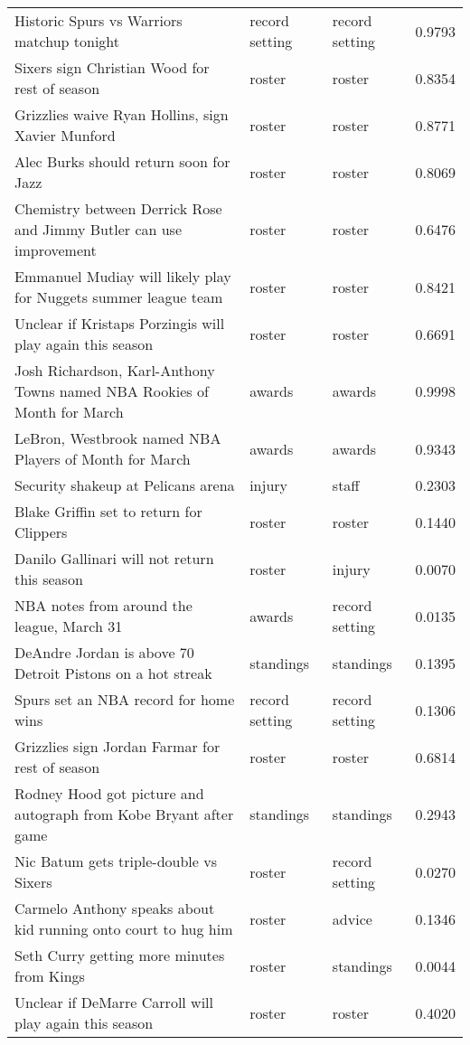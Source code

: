 \begin{table}[!htbp]
\begin{center}
\begin{tabular}{ l l l l}
Historic Spurs vs Warriors matchup tonight & record setting & record setting & 0.9793\\
Sixers sign Christian Wood for rest of season & roster & roster & 0.8354\\
Grizzlies waive Ryan Hollins, sign Xavier Munford & roster & roster & 0.8771\\
Alec Burks should return soon for Jazz & roster & roster & 0.8069\\
Chemistry between Derrick Rose and Jimmy Butler can use improvement & roster & roster & 0.6476\\
Emmanuel Mudiay will likely play for Nuggets summer league team & roster & roster & 0.8421\\
Unclear if Kristaps Porzingis will play again this season & roster & roster & 0.6691\\
Josh Richardson, Karl-Anthony Towns named NBA Rookies of Month for March & awards & awards & 0.9998\\
LeBron, Westbrook named NBA Players of Month for March & awards & awards & 0.9343\\
Security shakeup at Pelicans arena & injury & staff & 0.2303\\
Blake Griffin set to return for Clippers & roster & roster & 0.1440\\
Danilo Gallinari will not return this season & roster & injury & 0.0070\\
NBA notes from around the league, March 31 & awards & record setting & 0.0135\\
DeAndre Jordan is above 70%
Detroit Pistons on a hot streak & standings & standings & 0.1395\\
Spurs set an NBA record for home wins & record setting & record setting & 0.1306\\
Grizzlies sign Jordan Farmar for rest of season & roster & roster & 0.6814\\
Rodney Hood got picture and autograph from Kobe Bryant after game & standings & standings & 0.2943\\
Nic Batum gets triple-double vs Sixers & roster & record setting & 0.0270\\
Carmelo Anthony speaks about kid running onto court to hug him & roster & advice & 0.1346\\
Seth Curry getting more minutes from Kings & roster & standings & 0.0044\\
Unclear if DeMarre Carroll will play again this season & roster & roster & 0.4020\\

\end{tabular}
\end{center}
\end{table}
